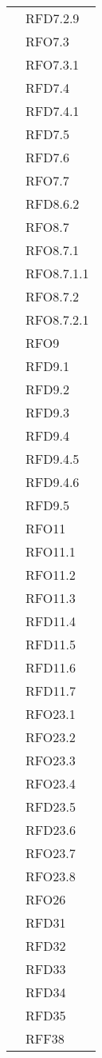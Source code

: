 \begin{longtable}{|>{\centering}m{10cm}|m{3cm}<{\centering}|}
& RFD7.2.9\\
& RFO7.3\\
& RFO7.3.1\\
& RFD7.4\\
& RFD7.4.1\\
& RFD7.5\\
& RFD7.6\\
& RFO7.7\\
& RFD8.6.2\\
& RFO8.7\\
& RFO8.7.1\\
& RFO8.7.1.1\\
& RFO8.7.2\\
& RFO8.7.2.1\\
& RFO9\\
& RFD9.1\\
& RFD9.2\\
& RFD9.3\\
& RFD9.4\\
& RFD9.4.5\\
& RFD9.4.6\\
& RFD9.5\\
& RFO11\\
& RFO11.1\\
& RFO11.2\\
& RFO11.3\\
& RFD11.4\\
& RFD11.5\\
& RFD11.6\\
& RFD11.7\\
& RFO23.1\\
& RFO23.2\\
& RFO23.3\\
& RFO23.4\\
& RFD23.5\\
& RFD23.6\\
& RFO23.7\\
& RFO23.8\\
& RFO26\\
& RFD31\\
& RFD32\\
& RFD33\\
& RFD34\\
& RFD35\\
& RFF38\\ \hline


\end{longtable}
